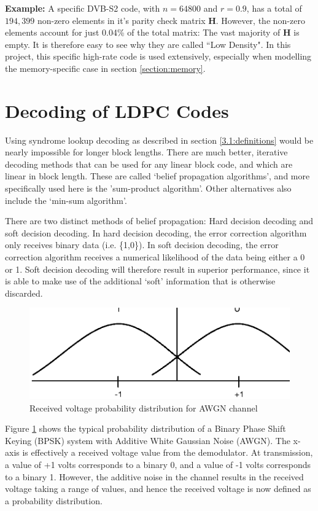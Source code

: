 \documentclass[11pt]{article}
\numberwithin{equation}{subsection}
\begin{document}
\textbf{Example:}
A specific DVB-S2 code, with $n = 64800$ and $r = 0.9$, has a total of $194,399$ non-zero elements in it's parity check matrix $\mathbf{H}$. However, the non-zero elements account for just 0.04\% of the total matrix: The vast majority of $\mathbf{H}$ is empty. It is therefore easy to see why they are called ``Low Density". In this project, this specific high-rate code is used extensively, especially when modelling the memory-specific case in section \ref{section:memory}.


\section{Decoding of LDPC Codes} \label{decoding}
Using syndrome lookup decoding as described in section \ref{3.1:definitions} would be nearly impossible for longer block lengths. There are much better, iterative decoding methods that can be used for any linear block code, and which are linear in block length. These are called `belief propagation algorithms', and more specifically used here is the 'sum-product algorithm'. Other alternatives also include the `min-sum algorithm'.

There are two distinct methods of belief propagation: Hard decision decoding and soft decision decoding. In hard decision decoding, the error correction algorithm only receives binary data (i.e. \{1,0\}). In soft decision decoding, the error correction algorithm receives a numerical likelihood of the data being either a 0 or 1. Soft decision decoding will therefore result in superior performance, since it is able to make use of the additional `soft' information that is otherwise discarded.

\begin{figure}[h]
\centering
\includegraphics{BPSK_channel_graph}
\caption{Received voltage probability distribution for AWGN channel}
\label{figure:awgn probability graph}
\end{figure}

Figure \ref{figure:awgn probability graph} shows the typical probability distribution of a Binary Phase Shift Keying (BPSK) system with Additive White Gaussian Noise (AWGN). The x-axis is effectively a received voltage value from the demodulator. At transmission, a value of +1 volts corresponds to a binary 0, and a value of -1 volts corresponds to a binary 1. However, the additive noise in the channel results in the received voltage taking a range of values, and hence the received voltage is now defined as a probability distribution.
\end{document}
